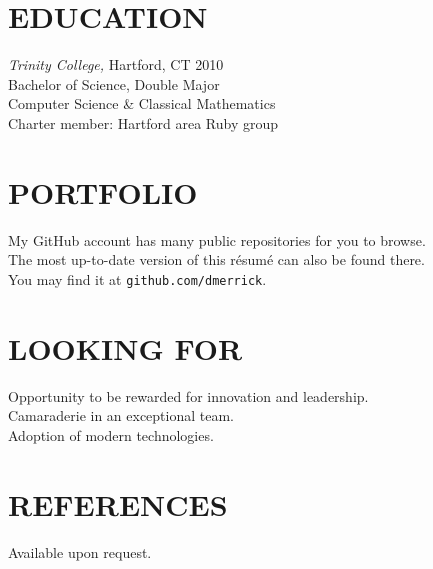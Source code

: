 \documentclass[line,margin]{res}
\begin{document}
\begin{resume}
\section{EDUCATION}
  {\sl Trinity College,}
  Hartford, CT \hfill 2010 \\
  Bachelor of Science, Double Major \\
  Computer Science \& Classical Mathematics \\
  Charter member: Hartford area Ruby group

\section{PORTFOLIO}
  My GitHub account has many public repositories for you to browse. \\
  The most up-to-date version of this r\'{e}sum\'{e} can also be found there. \\
  You may find it at \texttt{github.com/dmerrick}.

\section{LOOKING FOR}
  Opportunity to be rewarded for innovation and leadership. \\
  Camaraderie in an exceptional team. \\
  Adoption of modern technologies.

\section{REFERENCES}
  Available upon request.

\end{resume}
\end{document}

